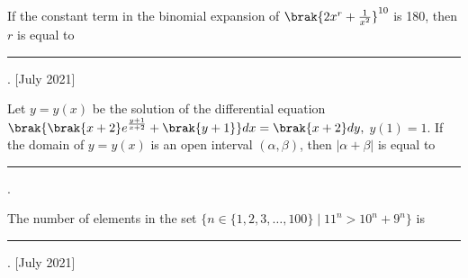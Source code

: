     \item If the constant term in the binomial expansion of $ \brak{2x^{r} + \frac{1}{x^2}}^{10} $ is 180, then $ r $ is equal to \rule{2.5cm}{0.4pt}.
    \hfill{[July 2021]}

    \item Let $ y = y(x) $ be the solution of the differential equation
    $
    \brak{\brak{x+2}e^{\frac{y+1}{x+2}}+\brak{y+1}} dx = \brak{x+2} dy,
    $
    $ y(1) = 1 $. If the domain of $ y = y(x) $ is an open interval $ (\alpha, \beta) $, then $ |\alpha + \beta| $ is equal to \rule{2.5cm}{0.4pt}.
    \item The number of elements in the set $ \{n \in \{1, 2, 3, \ldots, 100\} \mid 11^n > 10^n + 9^n \} $ is \rule{2.5cm}{0.4pt}.
    \hfill{[July 2021]}

